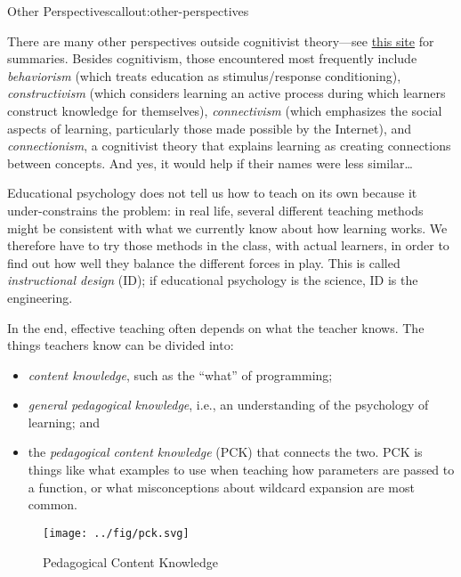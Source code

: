 \begin{callout}{Other Perspectives}{callout:other-perspectives}

There are many other perspectives outside cognitivist theory---see
\href{http://www.learning-theories.com/}{this site} for summaries.
Besides cognitivism, those encountered most frequently include
\emph{behaviorism} (which treats education as stimulus/response
conditioning), \emph{constructivism} (which considers learning an active
process during which learners construct knowledge for themselves),
\emph{connectivism} (which emphasizes the social aspects of learning,
particularly those made possible by the Internet), and
\emph{connectionism}, a cognitivist theory that explains learning as
creating connections between concepts. And yes, it would help if their
names were less similar\ldots{}
\end{callout}


Educational psychology does not tell us how to teach on its own because
it under-constrains the problem: in real life, several different
teaching methods might be consistent with what we currently know about
how learning works. We therefore have to try those methods in the class,
with actual learners, in order to find out how well they balance the
different forces in play. This is called \emph{instructional design}
(ID); if educational psychology is the science, ID is the engineering.


In the end, effective teaching often depends on what the teacher knows.
The things teachers know can be divided into:

\begin{itemize}
\item
  \emph{content knowledge}, such as the ``what'' of programming;
\item
  \emph{general pedagogical knowledge}, i.e., an understanding of the
  psychology of learning; and
\item
  the \emph{pedagogical content knowledge} (PCK) that connects the two.
  PCK is things like what examples to use when teaching how parameters
  are passed to a function, or what misconceptions about wildcard
  expansion are most common.
\end{itemize}

\begin{figure}[htbp]
\centering
\texttt{[image: ../fig/pck.svg]}
\caption{Pedagogical Content Knowledge}
\end{figure}

